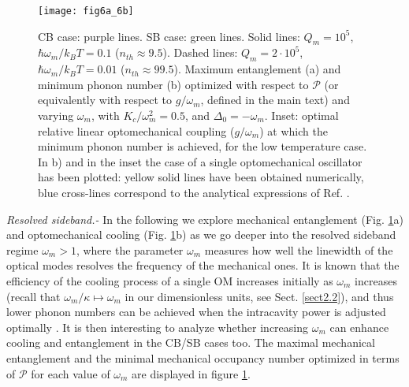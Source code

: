 \documentclass[a4paper]{jpconf}
\begin{document}
\begin{figure}[H]
 \centering
 \texttt{[image: fig6a\_6b]}
 \caption{\label{figuresix} CB case: purple lines. SB case: green lines. Solid 
lines: $Q_m=10^5$, $\hbar\omega_m/k_BT=0.1$ ($n_{th}\approx9.5$). Dashed lines: 
$Q_m=2\cdot10^5$, $\hbar\omega_m/k_BT=0.01$ ($n_{th}\approx99.5$). Maximum 
entanglement (a) and minimum phonon number (b) optimized with respect to $\mathcal{P}$ (or equivalently with respect to $g/\omega_m$, defined in the main text) and varying 
$\omega_m$, with $K_c/\omega_m^2=0.5$, and $\Delta_0=-\omega_m$. Inset: optimal relative linear optomechanical coupling ($g/\omega_m$) at which the minimum phonon number is achieved, for the low
temperature case. In b) and in the inset the case of a single optomechanical oscillator has been plotted:
yellow solid lines have been obtained numerically, blue cross-lines correspond to the analytical expressions of Ref. \cite{56}.}
\end{figure}

{\it Resolved sideband.-}  In the following we explore mechanical entanglement (Fig. \ref{figuresix}a) 
and optomechanical cooling (Fig. \ref{figuresix}b)  as we go deeper into the resolved sideband
regime $\omega_m>1$, where the parameter $\omega_m$ measures how well the linewidth of the optical modes resolves the frequency of the mechanical ones. It is known that  
the efficiency of the cooling process of a single OM  increases initially as $\omega_m$
increases \cite{15,16,56} (recall that $\omega_m/\kappa \mapsto\omega_m $ in our dimensionless units, see Sect. \ref{sect2.2}), and thus lower phonon numbers can be achieved 
when the intracavity power is adjusted optimally \cite{56}. It is then interesting to analyze whether increasing $\omega_m$
can enhance cooling and entanglement in the CB/SB cases too. The maximal mechanical entanglement and the minimal mechanical occupancy number optimized in terms of
 $\mathcal{P}$ for each value of $\omega_m$  are displayed in figure \ref{figuresix}.  
\end{document}
